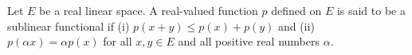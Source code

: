 Let $E$ be a real linear space. A real-valued function $p$ defined on $E$ is said to be a sublinear functional if (i) $p(x + y) \le p(x) + p(y)$ and (ii) $p(\alpha x) = \alpha p(x)$ for all $x, y \in E$ and all positive real numbers $\alpha$.
